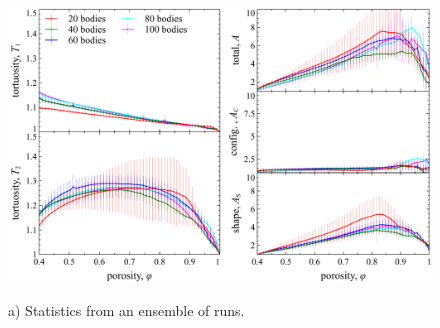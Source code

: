 \documentclass[3p]{elsarticle}
\begin{document}
\begin{figure}%
\centering \label{fig6}
\includegraphics[width = 0.99 \textwidth]{./figs/fig6.pdf}
\caption{
a) Statistics from an ensemble of runs.
}
\end{figure}



\end{document}
